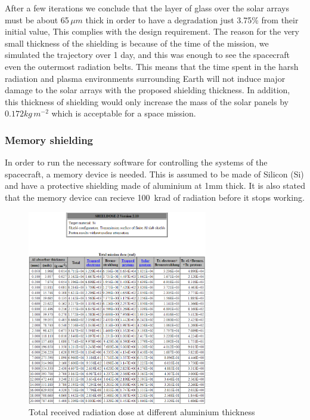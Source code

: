 After a few iterations we conclude that the layer of glass over the solar arrays must be about 65\,$\mu m$ thick in order to have a degradation just 3.75\% from their initial value, This complies with the design requirement. The reason for the very small thickness of the shielding is because of the time of the mission, we simulated the trajectory over 1 day, and this was enough to see the spacecraft even the outermost radiation belts. This means that the time spent in the harsh radiation and plasma environments surrounding Earth will not induce major damage to the solar arrays with the proposed shielding thickness. In addition, this thickness of shielding would only increase the mass of the solar panels by $0.172 kg\,m^{-2} $ which is acceptable for a space mission.

\subsubsection{Memory shielding}

In order to run the necessary software for controlling the systems of the spacecraft, a memory device is needed. This is assumed to be made of Silicon (Si) and have a protective shielding made of aluminium at 1mm thick. It is also stated that the memory device can recieve 100\, krad of radiation before it stops working. 

\begin{figure}[h!]
\centering
\includegraphics[width=0.7\textwidth]{figures/SiShielding.png}
\caption{Total received radiation dose at different aluminium thickness}
\label{SiShielding}
\end{figure}

